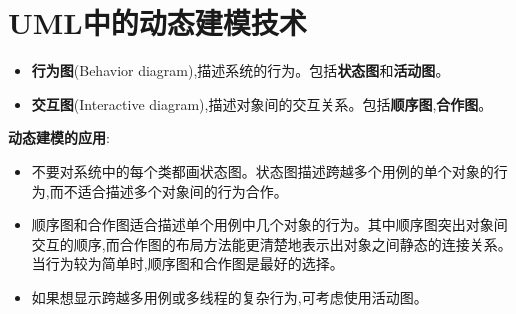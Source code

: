 \documentclass[../main.tex]{subfiles}
\begin{document}
\section{UML中的动态建模技术}
\begin{itemize}
  \item \textbf{行为图}(Behavior diagram),描述系统的行为。包括\textbf{状态图}和\textbf{活动图}。
  \item \textbf{交互图}(Interactive diagram),描述对象间的交互关系。包括\textbf{顺序图},\textbf{合作图}。
\end{itemize}
\noindent \textbf{动态建模的应用}:
\begin{itemize}
  \item 不要对系统中的每个类都画状态图。状态图描述跨越多个用例的单个对象的行为,而不适合描述多个对象间的行为合作。
  \item 顺序图和合作图适合描述单个用例中几个对象的行为。其中顺序图突出对象间交互的顺序,而合作图的布局方法能更清楚地表示出对象之间静态的连接关系。当行为较为简单时,顺序图和合作图是最好的选择。
  \item 如果想显示跨越多用例或多线程的复杂行为,可考虑使用活动图。
\end{itemize}
\end{document}
